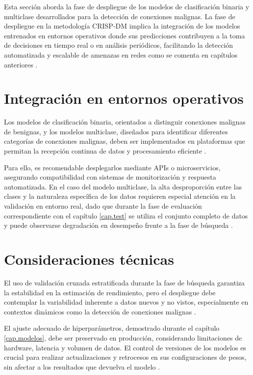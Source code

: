 Esta sección aborda la fase de despliegue de los modelos de clasificación binaria y multiclase desarrollados para la detección de conexiones malignas. La fase de despliegue en la metodología CRISP-DM implica la integración de los modelos entrenados en entornos operativos donde sus predicciones contribuyen a la toma de decisiones en tiempo real o en análisis periódicos, facilitando la detección automatizada y escalable de amenazas en redes como se comenta en capítulos anteriores \cite{wirth2000crisp}.

\section{Integración en entornos operativos}

Los modelos de clasificación binaria, orientados a distinguir conexiones malignas de benignas, y los modelos multiclase, diseñados para identificar diferentes categorías de conexiones malignas, deben ser implementados en plataformas que permitan la recepción continua de datos y procesamiento eficiente \cite{baylor2017tensorflow}. 

Para ello, es recomendable desplegarlos mediante APIs o microservicios, asegurando compatibilidad con sistemas de monitorización y respuesta automatizada. En el caso del modelo multiclase, la alta desproporción entre las clases y la naturaleza específica de los datos requieren especial atención en la validación en entorno real, dado que durante la fase de evaluación correspondiente con el capítulo \ref{cap.test} se utiliza el conjunto completo de datos y puede observarse degradación en desempeño frente a la fase de búsqueda \cite{gama2014survey}.

\section{Consideraciones técnicas}

El uso de validación cruzada estratificada durante la fase de búsqueda garantiza la estabilidad en la estimación de rendimiento, pero el despliegue debe contemplar la variabilidad inherente a datos nuevos y no vistos, especialmente en contextos dinámicos como la detección de conexiones malignas \cite{reimers2017optimal}. 

El ajuste adecuado de hiperparámetros, demostrado durante el capítulo \ref{cap.modelos}, debe ser preservado en producción, considerando limitaciones de hardware, latencia y volumen de datos. El control de versiones de los modelos es crucial para realizar actualizaciones y retrocesos en sus configuraciones de pesos, sin afectar a los resultados que devuelva el modelo \cite{peters2017machine}.

